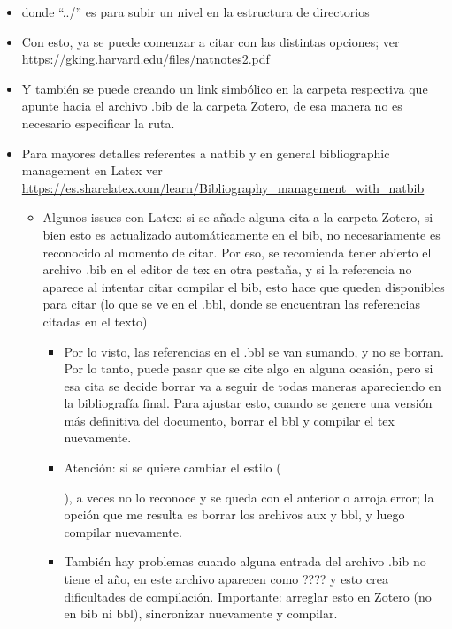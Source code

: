 \documentclass[
  11pt,
]{book}
\providecommand{\tightlist}{%
  \setlength{\itemsep}{0pt}\setlength{\parskip}{0pt}}
\begin{document}
\begin{itemize}
\item
  donde ``../'' es para subir un nivel en la estructura de directorios
\item
  Con esto, ya se puede comenzar a citar con las distintas opciones; ver \url{https://gking.harvard.edu/files/natnotes2.pdf}
\item
  Y también se puede creando un link simbólico en la carpeta respectiva que apunte hacia el archivo .bib de la carpeta Zotero, de esa manera no es necesario especificar la ruta.
\item
  Para mayores detalles referentes a natbib y en general bibliographic management en Latex ver \url{https://es.sharelatex.com/learn/Bibliography_management_with_natbib}

  \begin{itemize}
  \tightlist
  \item
    Algunos issues con Latex: si se añade alguna cita a la carpeta Zotero, si bien esto es actualizado automáticamente en el bib, no necesariamente es reconocido al momento de citar. Por eso, se recomienda tener abierto el archivo .bib en el editor de tex en otra pestaña, y si la referencia no aparece al intentar citar compilar el bib, esto hace que queden disponibles para citar (lo que se ve en el .bbl, donde se encuentran las referencias citadas en el texto)

    \begin{itemize}
    \tightlist
    \item
      Por lo visto, las referencias en el .bbl se van sumando, y no se borran. Por lo tanto, puede pasar que se cite algo en alguna ocasión, pero si esa cita se decide borrar va a seguir de todas maneras apareciendo en la bibliografía final. Para ajustar esto, cuando se genere una versión más definitiva del documento, borrar el bbl y compilar el tex nuevamente.
    \item
      Atención: si se quiere cambiar el estilo (

      

      ), a veces no lo reconoce y se queda con el anterior o arroja error; la opción que me resulta es borrar los archivos aux y bbl, y luego compilar nuevamente.
    \item
      También hay problemas cuando alguna entrada del archivo .bib no tiene el año, en este archivo aparecen como ???? y esto crea dificultades de compilación. Importante: arreglar esto en Zotero (no en bib ni bbl), sincronizar nuevamente y compilar.
    \end{itemize}
  \end{itemize}
\end{itemize}
\end{document}

